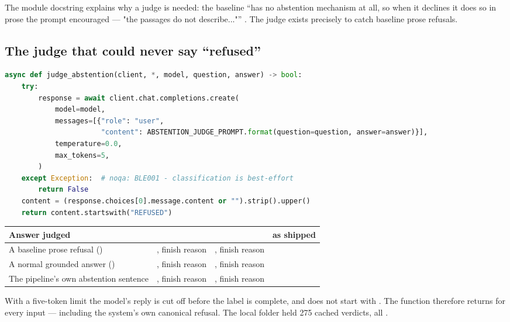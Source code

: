 The module docstring explains why a judge is needed: the baseline \enquote{has no abstention mechanism at all, so when it declines it does so in prose the prompt encouraged --- "the passages do not describe..."} . The judge exists precisely to catch baseline prose refusals.

\subsection{The judge that could never say \enquote{refused}}
\label{sec:judge-bug}

\begin{lstlisting}[language=Python]
async def judge_abstention(client, *, model, question, answer) -> bool:
    try:
        response = await client.chat.completions.create(
            model=model,
            messages=[{"role": "user",
                       "content": ABSTENTION_JUDGE_PROMPT.format(question=question, answer=answer)}],
            temperature=0.0,
            max_tokens=5,
        )
    except Exception:  # noqa: BLE001 - classification is best-effort
        return False
    content = (response.choices[0].message.content or "").strip().upper()
    return content.startswith("REFUSED")
\end{lstlisting}

\begin{measured}
\begin{center}\small
\begin{tabularx}{\textwidth}{@{}>{\raggedright\arraybackslash}p{4.6cm}>{\raggedright\arraybackslash}p{3.3cm}>{\raggedright\arraybackslash}p{3.3cm}L@{}}
\toprule
\textbf{Answer judged} & \textbf{} & \textbf{} & \textbf{ as shipped}\\
\midrule
A baseline prose refusal () & , finish reason  & , finish reason  & \\
A normal grounded answer () & , finish reason  & , finish reason  & \\
The pipeline's own abstention sentence & , finish reason  & , finish reason  & \\
\bottomrule
\end{tabularx}
\end{center}
With a five-token limit the model's reply is cut off before the label is complete, and  does not start with . The function therefore returns  for every input --- including the system's own canonical refusal. The local  folder held 275 cached verdicts, all .
\end{measured}

